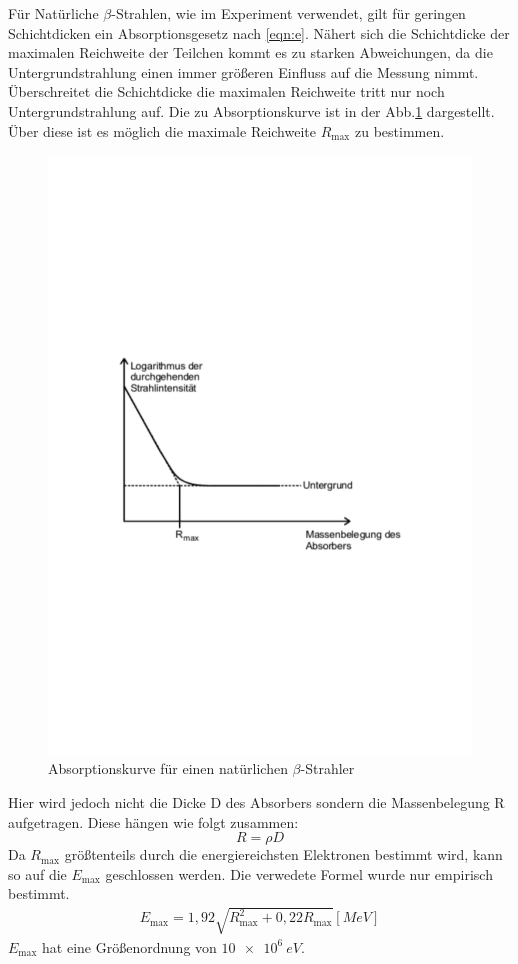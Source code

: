 Für Natürliche $\beta$-Strahlen, wie im Experiment verwendet, gilt für geringen Schichtdicken ein Absorptionsgesetz nach \eqref{eqn:e}.
Nähert sich die Schichtdicke der maximalen Reichweite der Teilchen kommt es zu starken Abweichungen, da die Untergrundstrahlung einen immer größeren Einfluss auf die Messung nimmt.
Überschreitet die Schichtdicke die maximalen Reichweite tritt nur noch Untergrundstrahlung auf.
Die zu Absorptionskurve ist in der Abb.\ref{fig:Ab} dargestellt.
Über diese ist es möglich die maximale Reichweite $R_{\text{max}}$ zu bestimmen.
\begin{figure}[h!]
  \centering
  \includegraphics[width=\textwidth]{Ab.pdf}
  \caption{Absorptionskurve für einen natürlichen $\beta$-Strahler \cite{1}}
  \label{fig:Ab}
\end{figure}
Hier wird jedoch nicht die Dicke D des Absorbers sondern die Massenbelegung R aufgetragen. Diese hängen wie folgt zusammen:
\begin{equation}
  R=\rho D
  \label{eqn:massenbelegung}
\end{equation}
Da $R_{\text{max}}$ größtenteils durch die energiereichsten Elektronen bestimmt wird, kann so auf die $E_{\text{max}}$ geschlossen werden.
Die verwedete Formel wurde nur empirisch bestimmt.
\begin{align}
  E_{\text{max}}= 1,92\sqrt{R^2_{\text{max}}+0,22R_{\text{max}}}[MeV]
\end{align}
$E_{\text{max}}$ hat eine Größenordnung von $\SI{10e6}{eV}$.
\FloatBarrier
